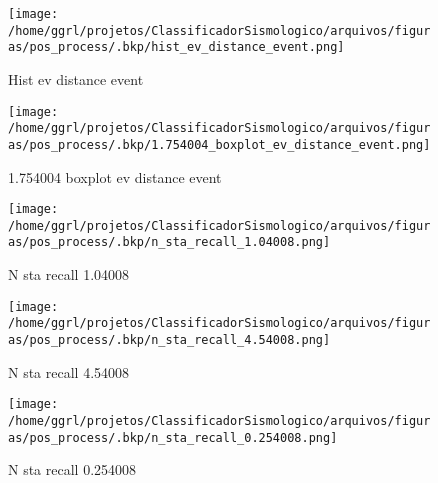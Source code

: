                     \begin{figure}[H]
                        \centering
                        \texttt{[image: /home/ggrl/projetos/ClassificadorSismologico/arquivos/figuras/pos\_process/.bkp/hist\_ev\_distance\_event.png]}
                        \caption{Hist ev distance event}
                        \label{fig:hist_ev_distance_event}
                    \end{figure}
                

                    \begin{figure}[H]
                        \centering
                        \texttt{[image: /home/ggrl/projetos/ClassificadorSismologico/arquivos/figuras/pos\_process/.bkp/1.754004\_boxplot\_ev\_distance\_event.png]}
                        \caption{1.754004 boxplot ev distance event}
                        \label{fig:1.754004_boxplot_ev_distance_event}
                    \end{figure}
                

                    \begin{figure}[H]
                        \centering
                        \texttt{[image: /home/ggrl/projetos/ClassificadorSismologico/arquivos/figuras/pos\_process/.bkp/n\_sta\_recall\_1.04008.png]}
                        \caption{N sta recall 1.04008}
                        \label{fig:n_sta_recall_1.04008}
                    \end{figure}
                

                    \begin{figure}[H]
                        \centering
                        \texttt{[image: /home/ggrl/projetos/ClassificadorSismologico/arquivos/figuras/pos\_process/.bkp/n\_sta\_recall\_4.54008.png]}
                        \caption{N sta recall 4.54008}
                        \label{fig:n_sta_recall_4.54008}
                    \end{figure}
                

                    \begin{figure}[H]
                        \centering
                        \texttt{[image: /home/ggrl/projetos/ClassificadorSismologico/arquivos/figuras/pos\_process/.bkp/n\_sta\_recall\_0.254008.png]}
                        \caption{N sta recall 0.254008}
                        \label{fig:n_sta_recall_0.254008}
                    \end{figure}
                

